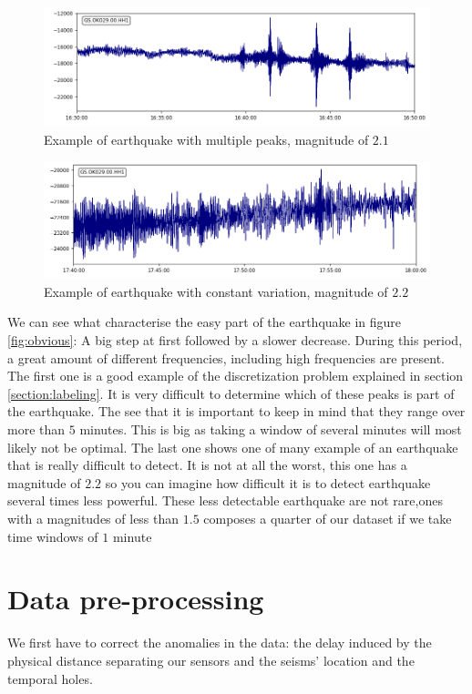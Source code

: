 \documentclass[10pt,conference,compsocconf]{IEEEtran}
\begin{document}
\begin{figure}[h]
  \centering
	\includegraphics[width=\columnwidth]{multiple-peaks-example.png}
  \caption{Example of earthquake with multiple peaks, magnitude of $2.1$}
	\label{fig:multiplepeaks}
\end{figure}
\begin{figure}[h]
  \centering
	\includegraphics[width=\columnwidth]{constant-variation-example.png}
  \caption{Example of earthquake with constant variation, magnitude of $2.2$}
	\label{fig:constanteq}
\end{figure}

We can see what characterise the easy part of the earthquake in figure \ref{fig:obvious}: A big step at first followed by a slower decrease. During this period, a great amount of different frequencies, including high frequencies are present. The first one is a good example of the discretization problem explained in section \ref{section:labeling}. It is very difficult to determine which of these peaks is part of the earthquake. The see that it is important to keep in mind that they range over more than $5$ minutes. This is big as taking a window of several minutes will most likely not be optimal. The last one shows one of many example of an earthquake that is really difficult to detect. It is not at all the worst, this one has a magnitude of $2.2$ so you can imagine how difficult it is to detect earthquake several times less powerful. These less detectable earthquake are not rare,ones with a magnitudes of less than $1.5$ composes a quarter of our dataset if we take time windows of $1$ minute

\section{Data pre-processing}
We first have to correct the anomalies in the data: the delay induced by the physical distance separating our sensors and the seisms' location and the temporal holes.\newline
\end{document}
